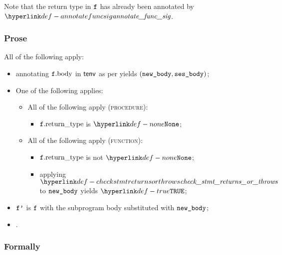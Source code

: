 Note that the return type in $\vf$ has already been annotated by $\annotatefuncsig$.

\subsubsection{Prose}
All of the following apply:
\begin{itemize}
  \item annotating $\vf.\funcbody$ in $\tenv$ as per  yields $(\newbody, \vsesbody)$\ProseOrTypeError;
  \item One of the following applies:
  \begin{itemize}
    \item All of the following apply (\textsc{procedure}):
    \begin{itemize}
      \item $\vf.\funcreturntype$ is $\None$;
    \end{itemize}

    \item All of the following apply (\textsc{function}):
    \begin{itemize}
      \item $\vf.\funcreturntype$ is not $\None$;
      \item applying $\checkstmtreturnsorthrows$ to $\newbody$ yields $\True$\ProseOrTypeError;
    \end{itemize}
  \end{itemize}
  \item $\vfp$ is $\vf$ with the subprogram body substituted with $\newbody$;
  \item {}.
\end{itemize}

\subsubsection{Formally}
\begin{mathpar}
\end{mathpar}

